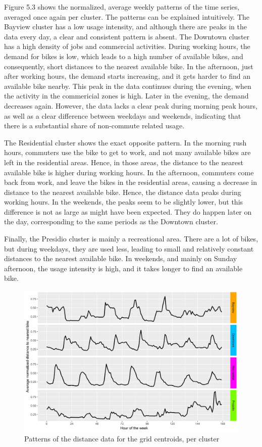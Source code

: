 \documentclass[12pt,oneside]{reedthesis}
\begin{document}
Figure 5.3 shows the normalized, average weekly patterns of the time
series, averaged once again per cluster. The patterns can be explained
intuitively. The Bayview cluster has a low usage intensity, and although
there are peaks in the data every day, a clear and consistent pattern is
absent. The Downtown cluster has a high density of jobs and commercial
activities. During working hours, the demand for bikes is low, which
leads to a high number of available bikes, and consequently, short
distances to the nearest available bike. In the afternoon, just after
working hours, the demand starts increasing, and it gets harder to find
an available bike nearby. This peak in the data continues during the
evening, when the activity in the commericial zones is high. Later in
the evening, the demand decreases again. However, the data lacks a clear
peak during morning peak hours, as well as a clear difference between
weekdays and weekends, indicating that there is a substantial share of
non-commute related usage.

The Residential cluster shows the exact opposite pattern. In the morning
rush hours, commuters use the bike to get to work, and not many
available bikes are left in the residential areas. Hence, in those
areas, the distance to the nearest available bike is higher during
working hours. In the afternoon, commuters come back from work, and
leave the bikes in the residential areas, causing a decrease in distance
to the nearest available bike. Hence, the distance data peaks during
working hours. In the weekends, the peaks seem to be slightly lower, but
this difference is not as large as might have been expected. They do
happen later on the day, corresponding to the same periods as the
Downtown cluster.

Finally, the Presidio cluster is mainly a recreational area. There are a
lot of bikes, but during weekdays, they are used less, leading to small
and relatively constant distances to the nearest available bike. In
weekends, and mainly on Sunday afternoon, the usage intensity is high,
and it takes longer to find an available bike.
\begin{figure}[H]
\includegraphics[width=\textwidth]{Figures/clusterplots} \caption{Patterns of the distance data for the grid centroids, per cluster}\label{fig:patterns}
\end{figure}
\end{document}
